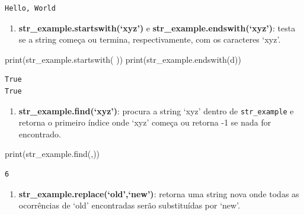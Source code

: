 \documentclass[
  brazilian,
  letterpaper,
  DIV=11,
  numbers=noendperiod]{scrreprt}
\newenvironment{Shaded}{\begin{snugshade}}{\end{snugshade}}
\newcommand{\BuiltInTok}[1]{\textcolor[rgb]{0.00,0.23,0.31}{#1}}
\newcommand{\NormalTok}[1]{\textcolor[rgb]{0.00,0.23,0.31}{#1}}
\newcommand{\StringTok}[1]{\textcolor[rgb]{0.13,0.47,0.30}{#1}}
\providecommand{\tightlist}{%
  \setlength{\itemsep}{0pt}\setlength{\parskip}{0pt}}
\begin{document}
\begin{verbatim}
Hello, World
\end{verbatim}

\begin{enumerate}
\def\labelenumi{\arabic{enumi}.}
\setcounter{enumi}{2}
\tightlist
\item
  \textbf{str\_example.startswith(`xyz')} e
  \textbf{str\_example.endswith(`xyz')}: testa se a string começa ou
  termina, respectivamente, com os caracteres `xyz'.
\end{enumerate}

\begin{Shaded}
\begin{Highlighting}[]
\BuiltInTok{print}\NormalTok{(str\_example.startswith(}\StringTok{\textquotesingle{} \textquotesingle{}}\NormalTok{))}
\BuiltInTok{print}\NormalTok{(str\_example.endswith(}\StringTok{\textquotesingle{}d\textquotesingle{}}\NormalTok{))}
\end{Highlighting}
\end{Shaded}

\begin{verbatim}
True
True
\end{verbatim}

\begin{enumerate}
\def\labelenumi{\arabic{enumi}.}
\setcounter{enumi}{3}
\tightlist
\item
  \textbf{str\_example.find(`xyz')}: procura a string `xyz' dentro de
  \texttt{str\_example} e retorna o primeiro índice onde `xyz' começa ou
  retorna -1 se nada for encontrado.
\end{enumerate}

\begin{Shaded}
\begin{Highlighting}[]
\BuiltInTok{print}\NormalTok{(str\_example.find(}\StringTok{\textquotesingle{},\textquotesingle{}}\NormalTok{))}
\end{Highlighting}
\end{Shaded}

\begin{verbatim}
6
\end{verbatim}

\begin{enumerate}
\def\labelenumi{\arabic{enumi}.}
\setcounter{enumi}{4}
\tightlist
\item
  \textbf{str\_example.replace(`old',`new')}: retorna uma string nova
  onde todas as ocorrências de `old' encontradas serão substituídas por
  `new'.
\end{enumerate}
\end{document}
